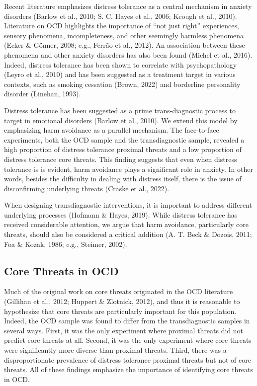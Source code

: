 \documentclass[
  man,floatsintext]{apa7}
\begin{document}
Recent literature emphasizes distress tolerance as a central mechanism in anxiety disorders (Barlow et al., 2010; S. C. Hayes et al., 2006; Keough et al., 2010).
Literature on OCD highlights the importance of ``not just right'' experiences, sensory phenomena, incompleteness, and other seemingly harmless phenomena (Ecker \& Gönner, 2008; e.g., Ferrão et al., 2012).
An association between these phenomena and other anxiety disorders has also been found (Michel et al., 2016).
Indeed, distress tolerance has been shown to correlate with psychopathology (Leyro et al., 2010) and has been suggested as a treatment target in various contexts, such as smoking cessation (Brown, 2022) and borderline personality disorder (Linehan, 1993).

Distress tolerance has been suggested as a prime trans-diagnostic process to target in emotional disorders (Barlow et al., 2010).
We extend this model by emphasizing harm avoidance as a parallel mechanism.
The face-to-face experiments, both the OCD sample and the transdiagnostic sample, revealed a high proportion of distress tolerance proximal threats and a low proportion of distress tolerance core threats.
This finding suggests that even when distress tolerance is is evident, harm avoidance plays a significant role in anxiety.
In other words, besides the difficulty in dealing with distress itself, there is the issue of disconfirming underlying threats (Craske et al., 2022).

When designing transdiagnostic interventions, it is important to address different underlying processes (Hofmann \& Hayes, 2019).
While distress tolerance has received considerable attention, we argue that harm avoidance, particularly core threats, should also be considered a critical addition (A. T. Beck \& Dozois, 2011; Foa \& Kozak, 1986; e.g., Steimer, 2002).

\subsection{Core Threats in OCD}\label{core-threats-in-ocd}

Much of the original work on core threats originated in the OCD literature (Gillihan et al., 2012; Huppert \& Zlotnick, 2012), and thus it is reasonable to hypothesize that core threats are particularly important for this population.
Indeed, the OCD sample was found to differ from the transdiagnostic samples in several ways.
First, it was the only experiment where proximal threats did not predict core threats at all.
Second, it was the only experiment where core threats were significantly more diverse than proximal threats.
Third, there was a disproportionate prevalence of distress tolerance proximal threats but not of core threats.
All of these findings emphasize the importance of identifying core threats in OCD.
\end{document}
